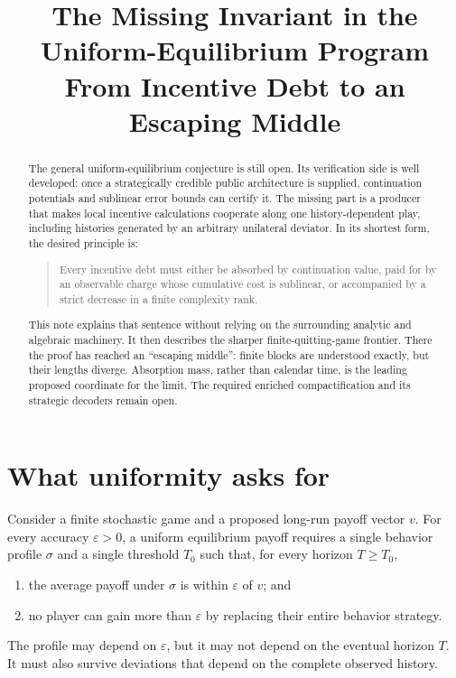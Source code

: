 \documentclass[11pt]{article}
\title{The Missing Invariant in the Uniform-Equilibrium Program\\
\large From Incentive Debt to an Escaping Middle}
\author{}
\date{}
\begin{document}
\maketitle

\begin{abstract}
The general uniform-equilibrium conjecture is still open.  Its verification
side is well developed: once a strategically credible public architecture is
supplied, continuation potentials and sublinear error bounds can certify it.
The missing part is a producer that makes local incentive calculations
cooperate along one history-dependent play, including histories generated by
an arbitrary unilateral deviator.  In its shortest form, the desired
principle is:
\begin{quote}
Every incentive debt must either be absorbed by continuation value, paid for
by an observable charge whose cumulative cost is sublinear, or accompanied
by a strict decrease in a finite complexity rank.
\end{quote}
This note explains that sentence without relying on the surrounding analytic
and algebraic machinery.  It then describes the sharper finite-quitting-game
frontier.  There the proof has reached an ``escaping middle'': finite blocks
are understood exactly, but their lengths diverge.  Absorption mass, rather
than calendar time, is the leading proposed coordinate for the limit.  The
required enriched compactification and its strategic decoders remain open.
\end{abstract}

\section{What uniformity asks for}

Consider a finite stochastic game and a proposed long-run payoff vector
\(v\).  For every accuracy \(\varepsilon>0\), a uniform equilibrium payoff
requires a single behavior profile \(\sigma\) and a single threshold
\(T_0\) such that, for every horizon \(T\geq T_0\),
\begin{enumerate}
  \item the average payoff under \(\sigma\) is within \(\varepsilon\) of
        \(v\); and
  \item no player can gain more than \(\varepsilon\) by replacing their
        entire behavior strategy.
\end{enumerate}
The profile may depend on \(\varepsilon\), but it may not depend on the
eventual horizon \(T\).  It must also survive deviations that depend on the
complete observed history.
\end{document}

